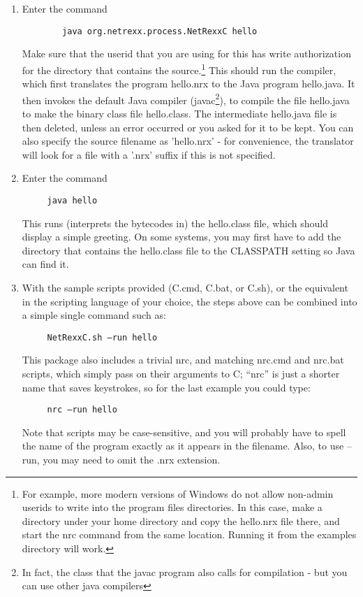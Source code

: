 \begin{enumerate}
\item Enter the command
 \begin{verbatim}
        java org.netrexx.process.NetRexxC hello
\end{verbatim}
Make sure that the userid that you are using for this has write
authorization for the directory that contains the source.\footnote{For example,
more modern versions of Windows do not allow non-admin userids to
write into the program files directories. In this case, make a
directory under your home directory and copy the hello.nrx file there,
and start the nrc command from the same location. Running it from the
examples directory will work.}
This should run the \nr{} compiler, which first translates the
\nr{} program hello.nrx to the Java program hello.java. It then
invokes the default Java compiler (javac\footnote{In fact, the class
  that the javac program also calls for compilation - but you can use
  other java compilers}), to compile the file hello.java to make the
binary class file hello.class. The intermediate hello.java file is
then deleted, unless an error occurred or you asked for it to be
kept. You can also specify the source filename as 'hello.nrx' - for
convenience, the translator will look for a file with a '.nrx' suffix
if this is not specified.
\item Enter the command
 \begin{verbatim} 
     java hello 
\end{verbatim}
This runs (interprets the bytecodes in) the hello.class file, which should display a simple greeting. On some systems, you may first have to add the directory that contains the hello.class file to the CLASSPATH setting so Java can find it. 
\item With the sample scripts provided (\nr{}C.cmd, \nr{}C.bat, or \nr{}C.sh), or the equivalent in the scripting language of your choice, the steps above can be combined into a simple single command such as:
  \begin{verbatim}
     NetRexxC.sh –run hello
\end{verbatim}
This package also includes a trivial nrc, and matching nrc.cmd and nrc.bat scripts, which simply pass on their arguments to \nr{}C; “nrc” is just a shorter name that saves keystrokes, so for the last example you could type: 
 \begin{verbatim}
     nrc –run hello
\end{verbatim}
Note that scripts may be case-sensitive, and you will probably have to spell the name of the program exactly as it appears in the filename. Also, to use –run, you may need to omit the .nrx extension. 

\end{enumerate}
